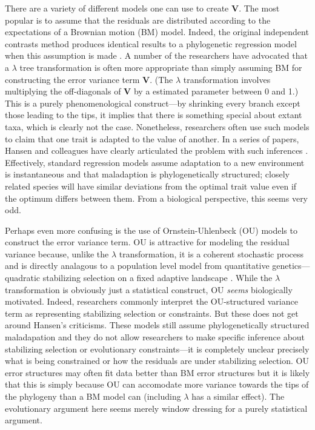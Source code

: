 There are a variety of different models one can use to create $\mathbf{V}$. The most popular is to assume that the residuals are distributed according to the expectations of a Brownian motion (BM) model. Indeed, the original independent contrasts method \citep{Felsenstein1985} produces identical results to a phylogenetic regression model when this assumption is made \citep{Blomberg2012}. A number of the researchers have advocated that a $\lambda$ tree transformation \citep{Pagel1999, Freckleton2002, Freckleton2011} is often more appropriate than simply assuming BM for constructing the error variance term $\mathbf{V}$. (The $\lambda$ transformation involves multiplying the off-diagonals of $\mathbf{V}$ by a estimated parameter between 0 and 1.) This is a purely phenomenological construct---by shrinking every branch except those leading to the tips, it implies that there is something special about extant taxa, which is clearly not the case. Nonetheless, researchers often use such models to claim that one trait is adapted to the value of another. In a series of papers, Hansen and colleagues have clearly articulated the problem with such inferences \citep{HansenOrzack2005, Hansen2008, Labra2009, Hansen2012SysBio}. Effectively, standard regression models assume adaptation to a new environment is instantaneous and that maladaption is phylogenetically structured; closely related species will have similar deviations from the optimal trait value even if the optimum differs between them. From a biological perspective, this seems very odd.

Perhaps even more confusing is the use of Ornstein-Uhlenbeck (OU) models to construct the error variance term. OU is attractive for modeling the residual variance because, unlike the $\lambda$ transformation, it is a coherent stochastic process and is directly analagous to a population level model from quantitative genetics---quadratic stabilizing selection on a fixed adaptive landscape \citep{Lande1976, HansenMartins1996}. While the $\lambda$ transformation is obviously just a statistical construct, OU \emph{seems} biologically motivated. Indeed, researchers commonly interpret the OU-structured variance term as representing stabilizing selection or constraints. But these does not get around Hansen's criticisms. These models still assume phylogenetically structured maladapation and they do not allow researchers to make specific inference about stabilizing selection or evolutionary constraints---it is completely unclear precisely what is being constrained or how the residuals are under stabilizing selection. OU error structures may often fit data better than BM error structures but it is likely that this is simply because OU can accomodate more variance towards the tips of the phylogeny than a BM model can (including $\lambda$ has a similar effect). The evolutionary argument here seems merely window dressing for a purely statistical argument. 

